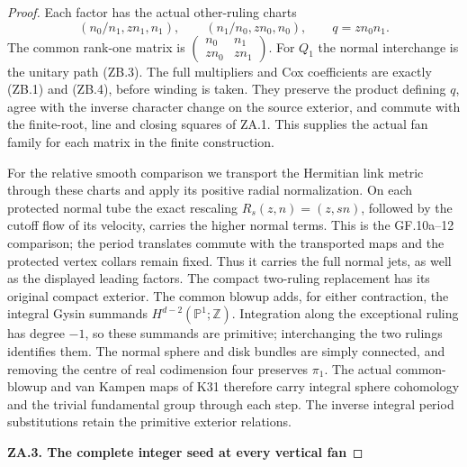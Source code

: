 \begin{proof}
Each factor has the actual other-ruling charts
\[
(n_0/n_1,zn_1,n_1),\qquad(n_1/n_0,zn_0,n_0),
\qquad q=zn_0n_1.
\]
The common rank-one matrix is
\(\left(\begin{smallmatrix}n_0&n_1\\zn_0&zn_1\end{smallmatrix}\right)\).
For \(Q_1\) the normal interchange is the unitary path (ZB.3).
The full multipliers and Cox coefficients are exactly (ZB.1) and
(ZB.4), before winding is taken. They preserve the product defining
\(q\), agree with the inverse character change on the source
exterior, and commute with the finite-root, line and closing squares
of ZA.1. This supplies the actual fan family for each matrix in the
finite construction.

For the relative smooth comparison we transport the Hermitian link
metric through these charts and apply its positive radial normalization.
On each protected normal tube the exact rescaling
\(R_s(z,n)=(z,sn)\), followed by the cutoff flow of its velocity,
carries the higher normal terms. This is the GF.10a--12 comparison;
the period translates commute with the transported maps and the
protected vertex collars remain fixed. Thus it carries the full
normal jets, as well as the displayed leading factors.
The compact two-ruling replacement has its original compact exterior.
The common blowup adds, for either contraction, the integral Gysin
summands \(H^{d-2}(\mathbb P^1;\mathbb Z)\). Integration along the
exceptional ruling has degree \(-1\), so these summands are primitive;
interchanging the two rulings identifies them. The normal sphere and
disk bundles are simply connected, and removing the centre of real
codimension four preserves \(\pi_1\). The actual common-blowup and
van Kampen maps of K31 therefore carry integral sphere cohomology
and the trivial fundamental group through each step. The inverse
integral period substitutions retain the primitive exterior relations.

\par

\medskip\noindent\textbf{ZA.3. The complete integer seed at every vertical fan}

\par\nopagebreak[4]


\end{proof}
